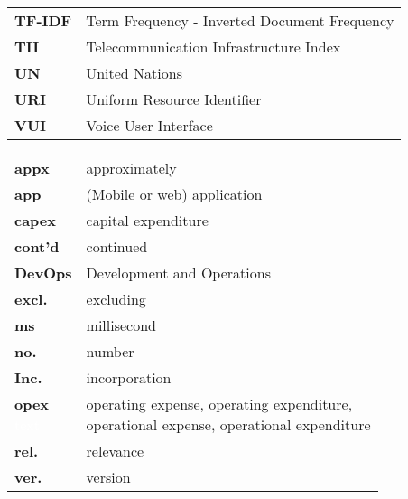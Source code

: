 \begin{flushleft}
\begin{tabular}{ll}
\textbf{TF-IDF}	&	Term Frequency - Inverted Document Frequency\\
\textbf{TII}	&	Telecommunication Infrastructure Index\\

\textbf{UN}		&	United Nations\\
\textbf{URI}		&	Uniform Resource Identifier\\


\textbf{VUI}	&	Voice User Interface\\




\end{tabular}
\end{flushleft}


\begin{flushleft}
	\begin{tabular}{ll}
		
\textbf{appx}	&	approximately\\
\textbf{app}	&	(Mobile or web) application\\
\textbf{capex}	&	capital expenditure\\
\textbf{cont'd}	&	continued\\
\textbf{DevOps}	&	Development and Operations\\
\textbf{excl.}	& 	excluding\\
\textbf{ms}	& 	millisecond\\

\textbf{no.}	& 	number\\

\textbf{Inc.}	&	incorporation\\
\shortstack[l]{\textbf{opex} \\ \textcolor{white}{text}}	& 	\shortstack[l]{operating expense, operating expenditure,\\ operational expense, operational expenditure} \\
\textbf{rel.}	&	relevance\\
\textbf{ver.}	& 	version \\
\end{tabular}
\end{flushleft}


\newpage
